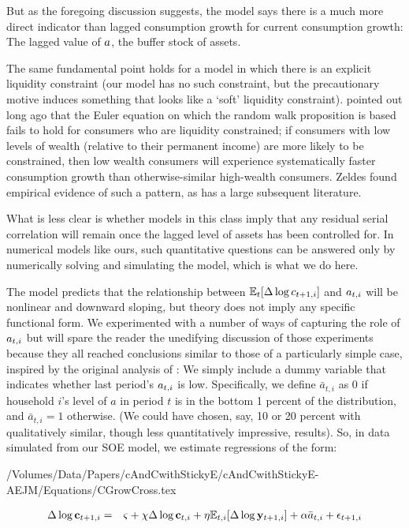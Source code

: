 \documentclass[titlepage]{./econtex}
\begin{document}
But as the foregoing discussion suggests, the model says there is a much more direct indicator than lagged consumption growth for current consumption growth:  The lagged value of $a$, the buffer stock of assets.

The same fundamental point holds for a model in which there is an explicit liquidity constraint (our model has no such constraint, but the precautionary motive induces something that looks like a `soft' liquidity constraint).  \cite{zeldes:jpe} pointed out long ago that the Euler equation on which the random walk proposition is based fails to hold for consumers who are liquidity constrained; if consumers with low levels of wealth (relative to their permanent income) are more likely to be constrained, then low wealth consumers will experience systematically faster consumption growth than otherwise-similar high-wealth consumers.  Zeldes found empirical evidence of such a pattern, as has a large subsequent literature.

What is less clear is whether models in this class imply that any residual serial correlation will remain once the lagged level of assets has been controlled for.  In numerical models like ours, such quantitative questions can be answered only by numerically solving and simulating the model, which is what we do here.

The model predicts that the relationship between $\operatorname{\mathbb{E}}_{t}[\Delta \log c_{t+1,i}]$ and $a_{t,i}$ will be nonlinear and downward sloping, but theory does not imply any specific functional form.  We experimented with a number of ways of capturing the role of $a_{t,i}$ but will spare the reader the unedifying discussion of those experiments because they all reached conclusions similar to those of a particularly simple case, inspired by the original analysis of \cite{zeldes:jpe}: We simply include a dummy variable that indicates whether last period's $a_{t,i}$ is low.  Specifically, we define $\bar{a}_{t,i}$ as 0 if household $i$'s level of ${a}$ in period $t$ is in the bottom 1 percent of the distribution, and $\bar{a}_{t,i}=1$ otherwise.  (We could have chosen, say, 10 or 20 percent with qualitatively similar, though less quantitatively impressive, results). So, in data simulated from our SOE model, we estimate regressions of the form: 

\begin{verbatimwrite}{/Volumes/Data/Papers/cAndCwithStickyE/cAndCwithStickyE-AEJM/Equations/CGrowCross.tex}
\end{verbatimwrite}
 \begin{eqnarray*}
\Delta \log \mathbf{c} _{t+1,i} &=& \varsigma + \chi \Delta \log \mathbf{c} _{t,i} + \eta {\operatorname{\mathbb{E}}}_{t,i}[\Delta \log \mathbf{y} _{t+1,i}]+ {\alpha} \bar{a}_{t,i}+\epsilon_{t+1,i}
\end{eqnarray*}
\end{document}
